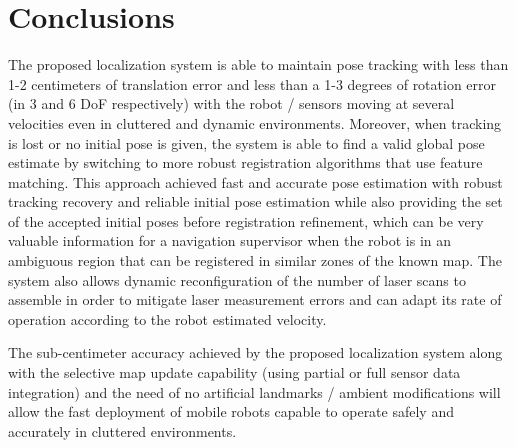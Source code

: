 \section{Conclusions}\label{sec:conclusions}

The proposed localization system is able to maintain pose tracking with less than 1-2 centimeters of translation error and less than a 1-3 degrees of rotation error (in 3 and 6 DoF respectively) with the robot / sensors moving at several velocities even in cluttered and dynamic environments. Moreover, when tracking is lost or no initial pose is given, the system is able to find a valid global pose estimate by switching to more robust registration algorithms that use feature matching. This approach achieved fast and accurate pose estimation with robust tracking recovery and reliable initial pose estimation while also providing the set of the accepted initial poses before registration refinement, which can be very valuable information for a navigation supervisor when the robot is in an ambiguous region that can be registered in similar zones of the known map. The system also allows dynamic reconfiguration of the number of laser scans to assemble in order to mitigate laser measurement errors and can adapt its rate of operation according to the robot estimated velocity.

The sub-centimeter accuracy achieved by the proposed localization system along with the selective map update capability (using partial or full sensor data integration) and the need of no artificial landmarks / ambient modifications will allow the fast deployment of mobile robots capable to operate safely and accurately in cluttered environments.
